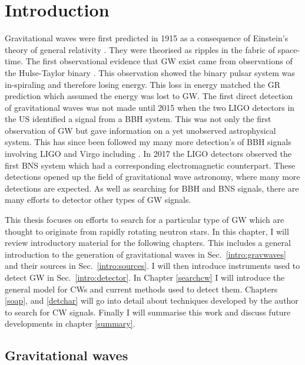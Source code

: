 \chapter{Introduction}


Gravitational waves were first predicted in 1915 as a consequence of Einstein's theory of general relativity \citep{}.
They were theorised as ripples in the fabric of space-time.
The first observational evidence that \ac{GW} exist came from observations of the Hulse-Taylor binary \citep{Weisberg1981GravitationalPulsar,Weisberg2004RelativisticAnalysis}. 
This observation showed the binary pulsar system was in-spiraling and therefore losing energy.
This loss in energy matched the \ac{GR} prediction which assumed the energy was lost to \ac{GW}.
The first direct detection of gravitational waves was not made until 2015 when the two \ac{LIGO} detectors in the US \citep{Abbott2016e} identified a signal from a \ac{BBH} system.
This was not only the first observation of \ac{GW} but gave information on a yet unobserved astrophysical system.
This has since been followed my many more detection's of \ac{BBH} signals involving \ac{LIGO} and Virgo including \citep{Abbott2017b,Abbott2019}.
In 2017 the \ac{LIGO} detectors observed the first \ac{BNS} system \citep{Abbott2017a} which had a corresponding electromagnetic counterpart.
These detections opened up the field of gravitational wave astronomy, where many more detections are expected.
As well as searching for \ac{BBH} and \ac{BNS} signals, there are many efforts to detector other types of \ac{GW} signals. 

\if
This thesis focuses on efforts to search for a particular type of \ac{GW} which are thought to originate from rapidly rotating neutron stars.
In this chapter, I will review introductory material for the following chapters. 
This includes a general introduction to the generation of gravitational waves in Sec.~\ref{intro:gravwaves} and their sources in Sec.~\ref{intro:sources}.
I will then introduce instruments used to detect \ac{GW} in Sec.~\ref{intro:detector}.
In Chapter \ref{searchcw} I will introduce the general model for \acp{CW} and current methods used to detect them.
Chapters \ref{soap}, \cite{cnn} and \ref{detchar} will go into detail about techniques developed by the author to search for \ac{CW} signals. 
Finally I will summarise this work and discuss future developments in chapter \ref{summary}.
\fi

\section{\label{intro:gravwaves}Gravitational waves}

